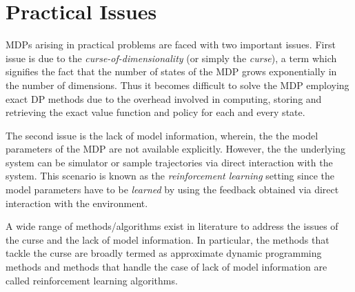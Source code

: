 \section{Practical Issues}
MDPs arising in practical problems are faced with two important issues. First issue is due to the \emph{curse-of-dimensionality} (or simply the \emph{curse}), a term which signifies the fact that the number of states of the MDP grows exponentially in the number of dimensions. Thus it becomes difficult to solve the MDP employing exact DP methods due to the overhead involved in computing, storing and retrieving the exact value function and policy for each and every state.\par
The second issue is the lack of model information, wherein, the the model parameters of the MDP are not available explicitly. However, the the underlying system can be simulator or sample trajectories via direct interaction with the system. This scenario is known as the \emph{reinforcement learning} setting since the model parameters have to be \emph{learned} by using the feedback obtained via direct interaction with the environment.\par
A wide range of methods/algorithms exist in literature to address the issues of the curse and the lack of model information. In particular, the methods that tackle the curse are broadly termed as approximate dynamic programming methods and methods that handle the case of lack of model information are called reinforcement learning algorithms. 
